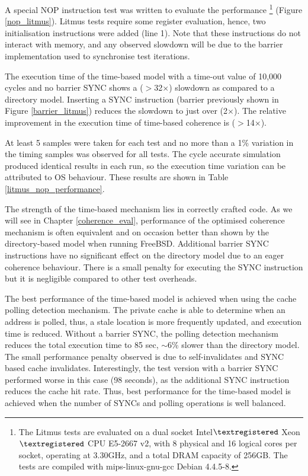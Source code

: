 		A special NOP instruction test was written to evaluate the performance \footnote{The Litmus tests are evaluated on a dual socket Intel$\textregistered$ Xeon$\textregistered$ CPU E5-2667 v2, with 8 physical and 16 logical cores per socket, operating at 3.30GHz, and a total DRAM capacity of 256GB. The tests are compiled with mips-linux-gnu-gcc Debian 4.4.5-8.}
		(Figure \ref{nop_litmus}). Litmus tests require some register evaluation, hence, two initialisation instructions were added (line 1). Note that these instructions do not interact with memory, and any observed slowdown will be due to the barrier implementation used to synchronise test iterations.
		
		The execution time of the time-based model with a time-out value of 10,000 cycles and no barrier SYNC shows a ($>$32$\times$) slowdown as compared to a directory model. Inserting a SYNC instruction (barrier previously shown in Figure \ref{barrier_litmus}) reduces the slowdown to just over (2$\times$). The relative improvement in the execution time of time-based coherence is ($>$14$\times$). 
		
		At least 5 samples were taken for each test and no more than a 1\% variation in the timing samples was observed for all tests. The cycle accurate simulation produced identical results in each run, so the execution time variation can be attributed to OS behaviour. These results are shown in Table \ref{litmus_nop_performance}. 
		
		The strength of the time-based mechanism lies in correctly crafted code. As we will see in Chapter \ref{coherence_eval}, performance of the optimised coherence mechanism is often equivalent and on occasion better than shown by the directory-based model when running FreeBSD. Additional barrier SYNC instructions have no significant effect on the directory model due to an eager coherence behaviour. There is a small penalty for executing the SYNC instruction but it is negligible compared to other test overheads. 
		
		The best performance of the time-based model is achieved when using the cache polling detection mechanism. The private cache is able to determine when an address is polled, thus, a stale location is more frequently updated, and execution time is reduced. Without a barrier SYNC, the polling detection mechanism reduces the total execution time to 85 sec, $\sim$6\% slower than the directory model. The small performance penalty observed is due to self-invalidates and SYNC based cache invalidates. Interestingly, the test version with a barrier SYNC performed worse in this case (98 seconds), as the additional SYNC instruction reduces the cache hit rate. Thus, best performance for the time-based model is achieved when the number of SYNCs and polling operations is well balanced.

